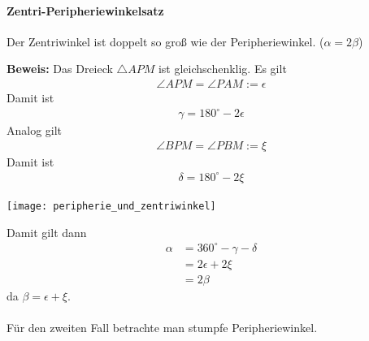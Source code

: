 \documentclass[11pt]{article}
\begin{document}
\paragraph{Zentri-Peripheriewinkelsatz} Der Zentriwinkel ist doppelt so groß wie der Peripheriewinkel. ($ \alpha = 2 \beta $)\\
\begin{minipage}{.6\textwidth}
\textbf{Beweis:} Das Dreieck $ \triangle APM $ ist gleichschenklig. Es gilt
\begin{equation*}
\begin{aligned}
\angle APM = \angle PAM := \epsilon
\end{aligned}
\end{equation*}
Damit ist
\begin{equation*}
\begin{aligned}
\gamma = 180^\circ - 2 \epsilon
\end{aligned}
\end{equation*}
Analog gilt
\begin{equation*}
\begin{aligned}
\angle BPM = \angle PBM := \xi
\end{aligned}
\end{equation*}
Damit ist
\begin{equation*}
\begin{aligned}
\delta = 180^\circ - 2 \xi
\end{aligned}
\end{equation*}
\end{minipage}
\begin{minipage}{.4\textwidth}
	\texttt{[image: peripherie\_und\_zentriwinkel]}
\end{minipage}
Damit gilt dann
\begin{equation*}
\begin{aligned}
\alpha &= 360^\circ - \gamma - \delta\\
&= 2\epsilon + 2 \xi\\
&= 2 \beta
\end{aligned}
\end{equation*}
da $ \beta = \epsilon + \xi $.\\
\\
Für den zweiten Fall betrachte man stumpfe Peripheriewinkel.
\end{document}
